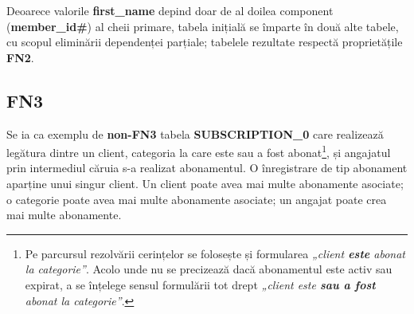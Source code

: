 \documentclass[a4paper, oneside, 12pt]{article}
\newcommand{\rowstyle}[1]{\gdef\currentrowstyle{#1}%
  #1\ignorespaces
}
\begin{document}

\begin{table}[H]
\centering
\caption*{Tabela \textbf{GROUP\_MEMBER\_0}:}
\end{table}

Deoarece valorile \textbf{first\_name} depind doar de al doilea component
(\textbf{member\_id\#}) al cheii primare, tabela inițială se împarte în două alte tabele,
cu scopul eliminării dependenței parțiale; tabelele rezultate respectă proprietățile \textbf{FN2}.

\begin{table}[H]
\centering
\caption*{Tabela \textbf{GROUP\_MEMBER\_1}:}
\end{table}

\begin{table}[H]
\centering
\caption*{Tabela \textbf{GROUP\_MEMBER\_2}:}
\end{table}

\subsection{FN3}

Se ia ca exemplu de \textbf{non-FN3} tabela \textbf{SUBSCRIPTION\_0} care
realizează legătura dintre un client, categoria la care este sau a fost
abonat\footnote{Pe parcursul rezolvării cerințelor se folosește și formularea
\emph{„client \textbf{este} abonat la categorie”}. Acolo unde nu se precizează dacă
abonamentul este activ sau expirat, a se înțelege sensul formulării tot drept \emph{„client este
\textbf{sau a fost} abonat la categorie”}.}, și angajatul prin intermediul
căruia s-a realizat abonamentul. O înregistrare de tip abonament aparține unui
singur client. Un client poate avea mai multe abonamente asociate; o categorie
poate avea mai multe abonamente asociate; un angajat poate crea mai multe
abonamente.
\end{document}
